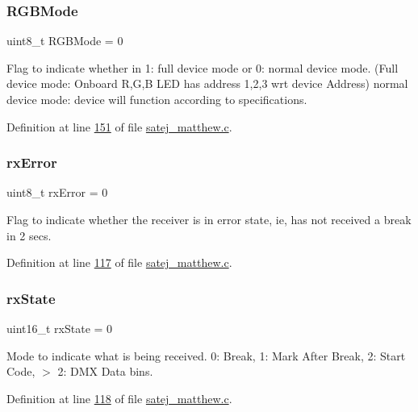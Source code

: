 \subsubsection{\texorpdfstring{RGBMode}{RGBMode}}
{\footnotesize\ttfamily uint8\+\_\+t R\+G\+B\+Mode = 0}

Flag to indicate whether in 1\+: full device mode or 0\+: normal device mode. (Full device mode\+: Onboard R,G,B L\+ED has address 1,2,3 wrt device Address) normal device mode\+: device will function according to specifications. 

Definition at line \mbox{\hyperlink{satej__matthew_8c_source_l00151}{151}} of file \mbox{\hyperlink{satej__matthew_8c_source}{satej\+\_\+matthew.\+c}}.

\mbox{\label{satej__matthew_8c_a3b602f53c4c8ee9c5b185230f0ed4e2e}} 
\subsubsection{\texorpdfstring{rxError}{rxError}}
{\footnotesize\ttfamily uint8\+\_\+t rx\+Error = 0}

Flag to indicate whether the receiver is in error state, ie, has not received a break in 2 secs. 

Definition at line \mbox{\hyperlink{satej__matthew_8c_source_l00117}{117}} of file \mbox{\hyperlink{satej__matthew_8c_source}{satej\+\_\+matthew.\+c}}.

\mbox{\label{satej__matthew_8c_a1270408cd1dbd2e41859adf94cb71e5d}} 
\subsubsection{\texorpdfstring{rxState}{rxState}}
{\footnotesize\ttfamily uint16\+\_\+t rx\+State = 0}

Mode to indicate what is being received. 0\+: Break, 1\+: Mark After Break, 2\+: Start Code, $>$ 2\+: D\+MX Data bins. 

Definition at line \mbox{\hyperlink{satej__matthew_8c_source_l00118}{118}} of file \mbox{\hyperlink{satej__matthew_8c_source}{satej\+\_\+matthew.\+c}}.

\mbox{\label{satej__matthew_8c_a70fc306096de2bed127c1afdc92bd30d}} 
